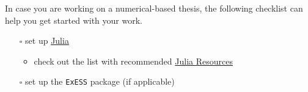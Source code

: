 \documentclass[
  letterpaper,
  DIV=11,
  numbers=noendperiod]{scrartcl}
\providecommand{\tightlist}{%
  \setlength{\itemsep}{0pt}\setlength{\parskip}{0pt}}\usepackage{longtable,booktabs,array}
\begin{document}
In case you are working on a numerical-based thesis, the following
checklist can help you get started with your work.

\begin{itemize}
\tightlist
\item[$\square$]
  set up \href{https://julialang.org/}{Julia}

  \begin{itemize}
  \tightlist
  \item
    check out the list with recommended
    \href{/manuals/julia_links/index.qmd}{Julia Resources}
  \end{itemize}
\item[$\square$]
  set up the \texttt{ExESS} package (if applicable)
\end{itemize}
\end{document}
